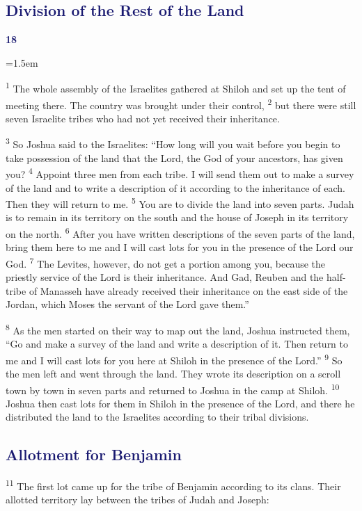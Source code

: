 \documentclass[12pt,twoside]{article}
\newcommand{\vs}[1]{\textsuperscript{#1}}
\newcommand{\chapterWithBigIndent}[2]{%
  \noindent
  \begin{minipage}[t]{1cm}
    \vspace{-0.4\baselineskip}
    {\textcolor{MidnightBlue}{\fontsize{40pt}{48pt}\selectfont \textbf{#1}}}
  \end{minipage}%
  \hspace{0.9cm}%
  \begin{minipage}[t]{\dimexpr\linewidth - 1.5cm - 0.3cm\relax}
    \hangindent=1.5em
    \hangafter=3
    #2
    \vspace{0.05cm}
  \end{minipage}
}
\begin{document}
\subsection*{\textcolor{MidnightBlue}{\textbf{Division of the Rest of the Land}}}

\chapterWithBigIndent{18}{
  \vs{1} The whole assembly of the Israelites gathered at Shiloh and set up the tent of meeting there. The country was brought under their control,
  \vs{2} but there were still seven Israelite tribes who had not yet received their inheritance.
}

\vs{3} So Joshua said to the Israelites: ``How long will you wait before you begin to take possession of the land that the Lord, the God of your ancestors, has given you?
\vs{4} Appoint three men from each tribe. I will send them out to make a survey of the land and to write a description of it according to the inheritance of each. Then they will return to me.
\vs{5} You are to divide the land into seven parts. Judah is to remain in its territory on the south and the house of Joseph in its territory on the north.
\vs{6} After you have written descriptions of the seven parts of the land, bring them here to me and I will cast lots for you in the presence of the Lord our God.
\vs{7} The Levites, however, do not get a portion among you, because the priestly service of the Lord is their inheritance. And Gad, Reuben and the half-tribe of Manasseh have already received their inheritance on the east side of the Jordan, which Moses the servant of the Lord gave them.''

\vs{8} As the men started on their way to map out the land, Joshua instructed them, ``Go and make a survey of the land and write a description of it. Then return to me and I will cast lots for you here at Shiloh in the presence of the Lord.''
\vs{9} So the men left and went through the land. They wrote its description on a scroll town by town in seven parts and returned to Joshua in the camp at Shiloh.
\vs{10} Joshua then cast lots for them in Shiloh in the presence of the Lord, and there he distributed the land to the Israelites according to their tribal divisions.

\subsection*{\textcolor{MidnightBlue}{\textbf{Allotment for Benjamin}}}

\vs{11} The first lot came up for the tribe of Benjamin according to its clans. Their allotted territory lay between the tribes of Judah and Joseph:
\end{document}
